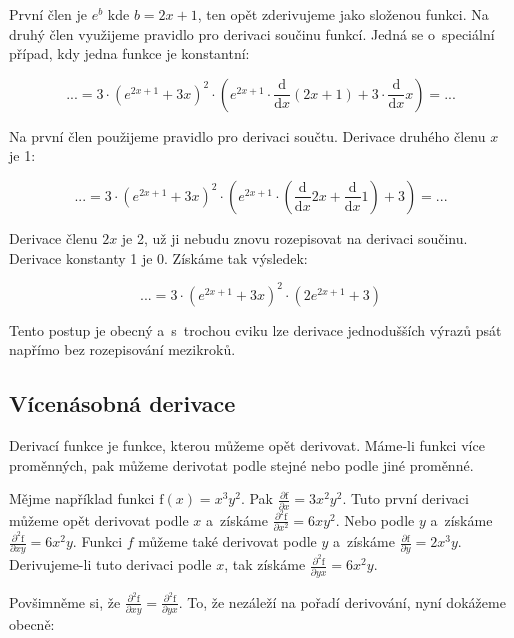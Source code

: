 První člen je \(e^b\) kde \(b = 2x + 1\), ten opět zderivujeme jako složenou funkci. Na druhý člen využijeme pravidlo pro derivaci součinu funkcí. Jedná se o~speciální případ, kdy jedna funkce je konstantní:

\begin{equation}
... = 3 \cdot \left(e^{2x+1} + 3x \right)^2 \cdot \left(e^{2x+1} \cdot \frac{\mathrm{d}}{\mathrm{d}x} \left(2x+1\right) + 3 \cdot \frac{\mathrm{d}}{\mathrm{d}x} x \right) = ...
\end{equation}

Na první člen použijeme pravidlo pro derivaci součtu. Derivace druhého členu \(x\) je 1:

\begin{equation}
... = 3 \cdot \left(e^{2x+1} + 3x \right)^2 \cdot \left(e^{2x+1} \cdot \left(\frac{\mathrm{d}}{\mathrm{d}x} 2x + \frac{\mathrm{d}}{\mathrm{d}x} 1\right) + 3 \right) = ...
\end{equation}

Derivace členu \(2x\) je 2, už ji nebudu znovu rozepisovat na derivaci součinu. Derivace konstanty 1 je 0. Získáme tak výsledek:

\begin{equation}
... = 3 \cdot \left(e^{2x+1} + 3x \right)^2 \cdot \left(2 e^{2x+1} + 3 \right)
\end{equation}

Tento postup je obecný a~s~trochou cviku lze derivace jednodušších výrazů psát napřímo bez rozepisování mezikroků. 

\subsection{Vícenásobná derivace}

Derivací funkce je funkce, kterou můžeme opět derivovat. Máme-li funkci více proměnných, pak můžeme derivotat podle stejné nebo podle jiné proměnné.

Mějme například funkci \(\mathrm{f}(x) = x^3 y^2\). Pak \(\frac{\partial \mathrm{f}}{\partial x} = 3 x^2 y^2\). Tuto první derivaci můžeme opět derivovat podle \(x\) a~získáme \(\frac{\partial^2 \mathrm{f}}{\partial x^2} = 6 x y^2\). Nebo podle \(y\) a~získáme \(\frac{\partial^2 \mathrm{f}}{\partial xy} = 6 x^2 y\).
Funkci \(f\) můžeme také derivovat podle \(y\) a~získáme \(\frac{\partial \mathrm{f}}{\partial y} = 2 x^3 y\). Derivujeme-li tuto derivaci podle \(x\), tak získáme \(\frac{\partial^2 \mathrm{f}}{\partial yx} = 6 x^2 y\).

Povšimněme si, že \(\frac{\partial^2 \mathrm{f}}{\partial xy} = \frac{\partial^2 \mathrm{f}}{\partial yx}\). To, že nezáleží na pořadí derivování, nyní dokážeme obecně:

